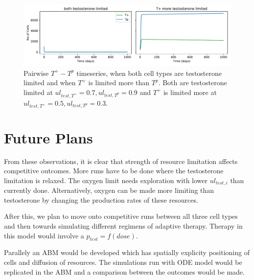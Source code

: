 \documentclass[a4paper]{article}
\begin{document}
\begin{figure}[h!]
  \centering
  \includegraphics[width=\textwidth]{Tpos-Tpro_testlims}
  \caption{Pairwise $T^+ - T^p$ timeseries, when both cell types are testosterone limited and when $T^+$ is limited more than $T^p$. Both are testosterone limited at $ul_{test,T^+}=0.7,ul_{test,T^p}=0.9$ and $T^+$ is limited more at $ul_{test,T^+}=0.5,ul_{test,T^p}=0.3$.}
  \label{fig_Tpos-Tpro_testlims}
\end{figure}

\section{Future Plans}
From these observations, it is clear that strength of resource limitation affects competitive outcomes. More runs have to be done where the testosterone limitation is relaxed. The oxygen limit needs exploration with lower $ul_{test,i}$ than currently done. Alternatively, oxygen can be made more limiting than testosterone by changing the production rates of these resources.

After this, we plan to move onto competitive runs between all three cell types and then towards simulating different regimens of adaptive therapy. Therapy in this model would involve a $p_{test} = f(dose)$.

Parallely an ABM would be developed which has spatially explicity positioning of cells and diffusion of resources. The simulations run with ODE model would be replicated in the ABM and a comparison between the outcomes would be made.

\printbibliography
\end{document}
